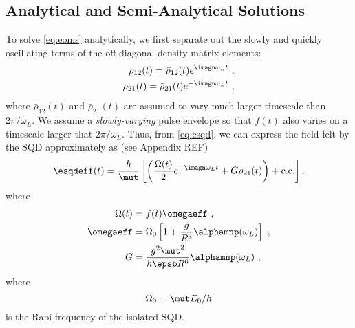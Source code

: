 \subsection{Analytical and Semi-Analytical Solutions}\label{sec:sqd-anal}

To solve \cref{eq:eoms} analytically, we first separate out the slowly and quickly oscillating terms of the
off-diagonal density matrix elements:
%
\begin{subequations}
    \begin{align}
        \rho_{12}(t) = \bar\rho_{12}(t)e^{\imagn\omega_L t} \ , \\
        \rho_{21}(t) = \bar\rho_{21}(t)e^{-\imagn\omega_L t} \ , 
    \end{align}
    \label{eq:rhobar}
\end{subequations}
%
where $\bar\rho_{12}(t)$ and $\bar\rho_{21}(t)$ are assumed to vary much larger
timescale than $2\pi/\omega_L$. We assume a {\it slowly-varying} pulse
envelope so that $f(t)$ also varies on a timescale larger that $2\pi/\omega_L$.
Thus, from \cref{eq:esqd}, we can express the field felt by the SQD
approximately as (see Appendix REF)
%
\begin{equation}
    \esqdeff(t) = \frac{\hbar}{\mut}\left[ \left( \frac{\Omega(t)}{2}e^{-\imagn\omega_L t} +
    G\rho_{21}(t) \right) + \text{c.c.} \right] ,
    \label{eq:effective_field}
\end{equation}
%
where
%
\begin{subequations}
    \begin{align}
        \Omega(t) &= f(t) \omegaeff \ , \label{eq:omega} \\
        \omegaeff &=  \Omega_0 \left[ 1 +
        \frac{g}{R^3}\alphamnp(\omega_L) \right] \ ,\label{eq:omegaeff}\\
        G &= \frac{g^2\mut^2 }{\hbar\epsb R^6}\alphamnp(\omega_L) \ , \label{eq:G}
    \end{align}
\end{subequations}
%
where
%
\begin{equation}
    \Omega_0 = \mut E_0/\hbar 
    \label{eq:omega_0}
\end{equation}
%
is the Rabi frequency of the isolated SQD.


